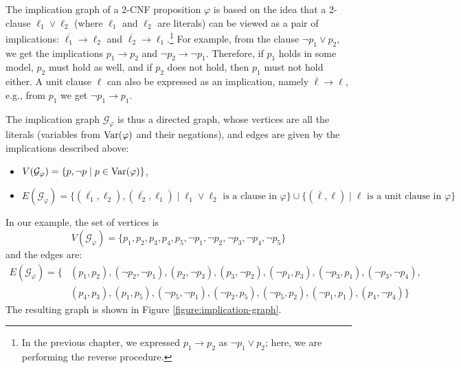The implication graph of a 2-CNF proposition $\varphi$ is based on the idea that a 2-clause $\ell_1 \lor \ell_2$ (where $\ell_1$ and $\ell_2$ are literals) can be viewed as a pair of implications: $\overline{\ell_1} \rightarrow \ell_2$ and $\overline{\ell_2} \rightarrow \ell_1$.\footnote{In the previous chapter, we expressed $p_1 \rightarrow p_2$ as $\neg p_1 \lor p_2$; here, we are performing the reverse procedure.} For example, from the clause $\neg p_1 \lor p_2$, we get the implications $p_1 \rightarrow p_2$ and $\neg p_2 \rightarrow \neg p_1$. Therefore, if $p_1$ holds in some model, $p_2$ must hold as well, and if $p_2$ does not hold, then $p_1$ must not hold either. A unit clause $\ell$ can also be expressed as an implication, namely $\overline{\ell} \rightarrow \ell$, e.g., from $p_1$ we get $\neg p_1 \rightarrow p_1$.

The implication graph $\mathcal{G}_\varphi$ is thus a directed graph, whose vertices are all the literals (variables from $\operatorname{Var}(\varphi)$ and their negations), and edges are given by the implications described above:
\begin{itemize}
    \item $V(\mathcal{G}_\varphi) = \{p, \neg p \mid p \in \operatorname{Var}(\varphi)\}$,
    \item $E(\mathcal{G}_\varphi) = \{(\overline{\ell_1}, \ell_2), (\overline{\ell_2}, \ell_1) \mid \ell_1 \lor \ell_2 \text{ is a clause in } \varphi\} \cup \{(\overline{\ell}, \ell) \mid \ell \text{ is a unit clause in } \varphi\}$
\end{itemize}

In our example, the set of vertices is
$$
V(\mathcal{G}_\varphi) = \{p_1, p_2, p_3, p_4, p_5, \neg p_1, \neg p_2, \neg p_3, \neg p_4, \neg p_5\}
$$
and the edges are:
\begin{align*}
    E(\mathcal{G}_\varphi) = \{&(p_1, p_2), (\neg p_2, \neg p_1), (p_2, \neg p_3), (p_3, \neg p_2), (\neg p_1, p_3), (\neg p_3, p_1), (\neg p_3, \neg p_4), \\
    &(p_4, p_3), (p_1, p_5), (\neg p_5, \neg p_1), (\neg p_2, p_5), (\neg p_5, p_2), (\neg p_1, p_1), (p_4, \neg p_4)\}
\end{align*}
The resulting graph is shown in Figure \ref{figure:implication-graph}.

